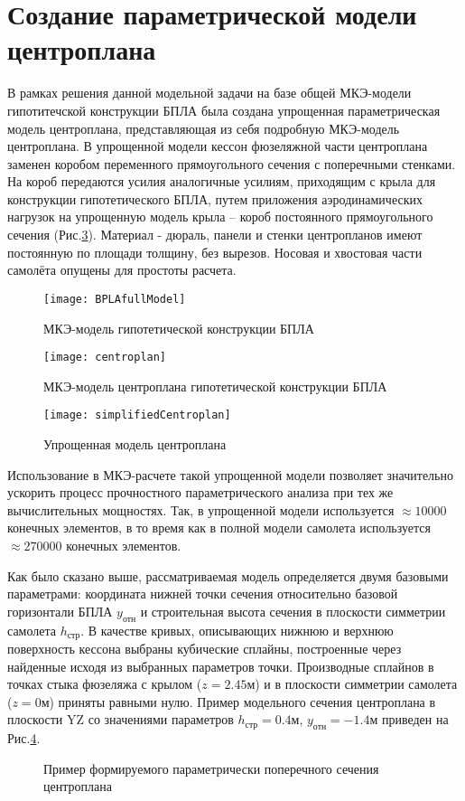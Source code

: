\section{Создание параметрической модели центроплана}
\label{sec:creationOfModel}

В рамках решения данной модельной задачи на базе общей МКЭ-модели гипотитечской конструкции БПЛА была создана упрощенная параметрическая модель центроплана, представляющая из себя подробную МКЭ-модель центроплана. В упрощенной модели кессон фюзеляжной части центроплана заменен коробом переменного прямоугольного сечения с поперечными стенками. На короб передаются усилия аналогичные усилиям, приходящим с крыла для конструкции гипотетического БПЛА, путем приложения аэродинамических нагрузок на упрощенную модель крыла -- короб постоянного прямоугольного сечения (Рис.\ref{fig:simplifiedCentroplanMKE}). Материал - дюраль, панели и стенки центропланов имеют постоянную по площади толщину, без вырезов. Носовая и хвостовая части самолёта опущены для простоты расчета.  


\begin{figure}[ht]
\centering 
\texttt{[image: BPLAfullModel]}
\caption{МКЭ-модель гипотетической конструкции БПЛА}
\label{fig:fullMKE}
\end{figure}

\begin{figure}[ht]
\centering 
\texttt{[image: centroplan]}
\caption{МКЭ-модель центроплана гипотетической конструкции БПЛА}
\label{fig:centroplanMKE}
\end{figure}

\begin{figure}[ht]
\centering
\texttt{[image: simplifiedCentroplan]}
\caption{Упрощенная модель центроплана}
\label{fig:simplifiedCentroplanMKE}
\end{figure}

Использование в МКЭ-расчете такой упрощенной модели позволяет значительно ускорить процесс прочностного параметрического анализа при тех же вычислительных мощностях. Так, в упрощенной модели используется $\approx10000$ конечных элементов, в то время как в полной модели самолета используется $\approx270000$ конечных элементов.

Как было сказано выше, рассматриваемая модель определяется двумя базовыми параметрами: координата нижней точки сечения относительно базовой горизонтали БПЛА $y_\text{отн}$ и строительная высота сечения в плоскости симметрии самолета $h_\text{стр}$. В качестве кривых, описывающих нижнюю и верхнюю поверхность кессона выбраны кубические сплайны, построенные через найденные исходя из выбранных параметров точки. Производные сплайнов в точках стыка фюзеляжа с крылом ($z=2.45\text{м}$) и в плоскости симметрии самолета ($z=0\text{м}$) приняты равными нулю. Пример модельного сечения центроплана в плоскости YZ со значениями параметров $h_\text{стр}=0.4\text{м}$, $y_\text{отн} = -1.4\text{м}$ приведен на Рис.\ref{fig:KessSectionExample}.

\begin{figure}[ht]
\centering
\def\svgwidth{\textwidth}

\caption{Пример формируемого параметрически поперечного сечения центроплана}
\label{fig:KessSectionExample}
\end{figure}

